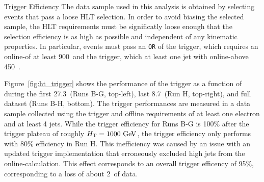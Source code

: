 \begin{section}{Trigger Efficiency}
The data sample used in this analysis is obtained by selecting events that pass a loose HLT selection.
In order to avoid biasing the selected sample, the HLT requirements must be significatly loose enough that the selection efficiency is as high as possible and independent of any kinematic properties.
In particular, events must pass an \texttt{OR} of the \trigHT trigger, which requires an online-\HT of at least 900~\GeV and the \trigJet trigger, which at least one jet with online-\pT above 450~\GeV.

Figure~\ref{fig:ht_trigger} shows the performance of the \trigHT trigger as a function of \HT during the first 27.3~\ifb (Runs B-G, top-left), last 8.7~\ifb (Run H, top-right), and full dataset (Runs B-H, bottom).
The trigger performances are measured in a data sample collected using the \trigEle trigger and offline requirements of at least one electron and at least 4 jets.
While the trigger efficiency for Runs B-G is 100\% after the trigger plateau of roughly $H_{\mathrm{T}} = 1000~\mathrm{Ge\kern -0.1em V}$, the trigger efficiency only performs with 80\% efficiency in Run H.
This inefficiency was caused by an issue with an updated trigger implementation that erroneously excluded high \pT jets from the online-\HT calculation.
This effect corresponds to an overall trigger efficency of 95\%, corresponding to a loss of about 2~\ifb of data.


\end{section}

